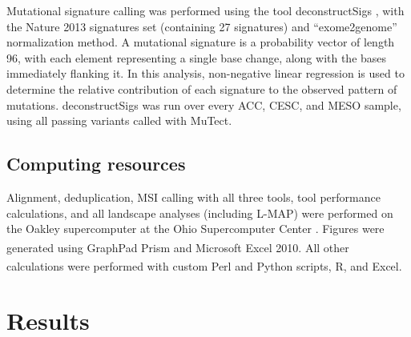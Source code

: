 Mutational signature calling was performed using the tool deconstructSigs \cite{rosenthal16}, with the Nature 2013 signatures set (containing 27 signatures) \cite{alexandrov2013} and ``exome2genome'' normalization method. A mutational signature is a probability vector of length 96, with each element representing a single base change, along with the bases immediately flanking it. In this analysis, non-negative linear regression is used to determine the relative contribution of each signature to the observed pattern of mutations. deconstructSigs was run over every ACC, CESC, and MESO sample, using all passing variants called with MuTect.

\subsection{Computing resources}
Alignment, deduplication, MSI calling with all three tools, tool performance calculations, and all landscape analyses (including L-MAP) were performed on the Oakley supercomputer at the Ohio Supercomputer Center \cite{Oakley2012}. Figures were generated using GraphPad Prism\textsuperscript\textregistered{} and Microsoft\textsuperscript\textregistered{} Excel\textsuperscript\texttrademark{} 2010. All other calculations were performed with custom Perl and Python scripts, R, and Excel\textsuperscript\texttrademark{}.

\section{Results}
